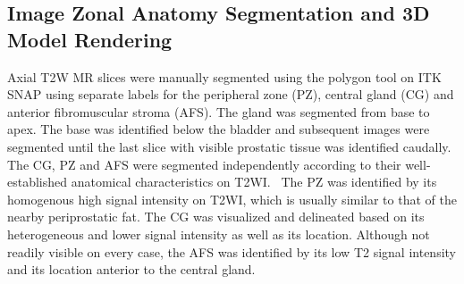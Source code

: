 \subsection{Image Zonal Anatomy Segmentation and 3D Model Rendering}
Axial T2W MR slices were manually segmented using the polygon tool on ITK SNAP
using separate labels for the peripheral zone (PZ), central gland (CG) and
anterior fibromuscular stroma (AFS). The gland was segmented from base to apex.
The base was identified below the bladder and subsequent images were segmented
until the last slice with visible prostatic tissue was identified caudally. The
CG, PZ and AFS were segmented independently according to their well-established
anatomical characteristics on
T2WI.~\cite{Verma2011,Jung2012,Poon1985,Hricak2007,Bonekamp2011} The PZ was
identified by its homogenous high signal intensity on T2WI, which is usually
similar to that of the nearby periprostatic fat. The CG was visualized and
delineated based on its heterogeneous and lower signal intensity as well as its
location. Although not readily visible on every case, the AFS was identified by
its low T2 signal intensity and its location anterior to the central gland. 
